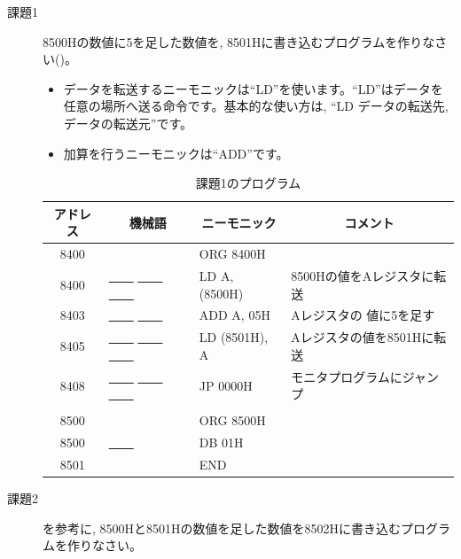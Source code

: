 \begin{description}



\item[課題1] 8500Hの数値に5を足した数値を, 8501Hに書き込むプログラムを作りなさい()。

\begin{itemize}
\item データを転送するニーモニックは``LD''を使います。``LD''はデータを
任意の場所へ送る命令です。基本的な使い方は, ``LD データの転送先,
データの転送元''です。

\item 加算を行うニーモニックは``ADD''です。
\end{itemize}


\begin{table}
\begin{center}
\caption{課題1のプログラム}
\label{tab:q1-1}
\small
\begin{tabular}{|c|l|l|l|}
\hline
アドレス& \multicolumn{1}{|c|}{機械語}&\multicolumn{1}{|c|}{ニーモニック}&\multicolumn{1}{|c|}{コメント}\\
\hline
   8400&             &       ORG 8400H     &\\
   8400&   \underline{~~~~} \underline{~~~~} \underline{~~~~}  &        LD A,
            (8500H)& 8500Hの値をAレジスタに転送\\
   8403&   \underline{~~~~} \underline{~~~~}     &        ADD A, 05H&Aレジスタの
                値に5を足す\\
   8405&   \underline{~~~~} \underline{~~~~} \underline{~~~~}  &        LD
            (8501H), A& Aレジスタの値を8501Hに転送\\
   8408&   \underline{~~~~} \underline{~~~~} \underline{~~~~}  &        JP
            0000H& モニタプログラムにジャンプ\\
       &             &       &\\
   8500&             &         ORG 8500H&\\
   8500&   \underline{~~~~}        &        DB 01H&\\
   8501&             &        END&\\
\hline
\end{tabular}
\end{center}
\end{table}



\item[課題2] を参考に, 8500Hと8501Hの数値を足した数値を8502Hに書き込むプログラムを作りなさい。



\end{description}
